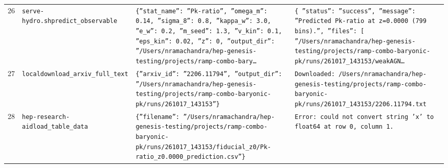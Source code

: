 \documentclass[11pt,a4paper]{article}
\begin{document}
\begin{longtable}{@{}p{}p{}p{}p{}@{}}
26 & \texttt{serve-hydro.sh}\newline\texttt{predict\_\allowbreak{}observable} & \texttt{\{''stat\_\allowbreak{}name'':\allowbreak{} ''Pk-ratio'',\allowbreak{} ''omega\_\allowbreak{}m'':\allowbreak{} 0.14,\allowbreak{} ''sigma\_\allowbreak{}8'':\allowbreak{} 0.8,\allowbreak{} ''kappa\_\allowbreak{}w'':\allowbreak{} 3.0,\allowbreak{} ''e\_\allowbreak{}w'':\allowbreak{} 0.2,\allowbreak{} ''m\_\allowbreak{}seed'':\allowbreak{} 1.3,\allowbreak{} ''v\_\allowbreak{}kin'':\allowbreak{} 0.1,\allowbreak{} ''eps\_\allowbreak{}kin'':\allowbreak{} 0.02,\allowbreak{} ''z'':\allowbreak{} 0,\allowbreak{} ''output\_\allowbreak{}dir'':\allowbreak{} ''/\allowbreak{}Users/\allowbreak{}nramachandra/\allowbreak{}hep-genesis-testing/\allowbreak{}projects/\allowbreak{}ramp-combo-bary\ldots{}\allowbreak{}} & \texttt{\{   ''status'':\allowbreak{} ''success'',\allowbreak{}   ''message'':\allowbreak{} ''Predicted Pk-ratio at z=\allowbreak{}0.0000 (799 bins)\allowbreak{}.'',\allowbreak{}   ''files'':\allowbreak{} [     ''/\allowbreak{}Users/\allowbreak{}nramachandra/\allowbreak{}hep-genesis-testing/\allowbreak{}projects/\allowbreak{}ramp-combo-baryonic-pk/\allowbreak{}runs/\allowbreak{}261017\_\allowbreak{}143153/\allowbreak{}weakAGN\ldots{}\allowbreak{}} \\
27 & \texttt{local}\newline\texttt{download\_\allowbreak{}arxiv\_\allowbreak{}full\_\allowbreak{}text} & \texttt{\{''arxiv\_\allowbreak{}id'':\allowbreak{} ''2206.11794'',\allowbreak{} ''output\_\allowbreak{}dir'':\allowbreak{} ''/\allowbreak{}Users/\allowbreak{}nramachandra/\allowbreak{}hep-genesis-testing/\allowbreak{}projects/\allowbreak{}ramp-combo-baryonic-pk/\allowbreak{}runs/\allowbreak{}261017\_\allowbreak{}143153''\}\allowbreak{}} & \texttt{Downloaded:\allowbreak{} /\allowbreak{}Users/\allowbreak{}nramachandra/\allowbreak{}hep-genesis-testing/\allowbreak{}projects/\allowbreak{}ramp-combo-baryonic-pk/\allowbreak{}runs/\allowbreak{}261017\_\allowbreak{}143153/\allowbreak{}2206.11794.txt} \\
28 & \texttt{hep-research-aid}\newline\texttt{load\_\allowbreak{}table\_\allowbreak{}data} & \texttt{\{''filename'':\allowbreak{} ''/\allowbreak{}Users/\allowbreak{}nramachandra/\allowbreak{}hep-genesis-testing/\allowbreak{}projects/\allowbreak{}ramp-combo-baryonic-pk/\allowbreak{}runs/\allowbreak{}261017\_\allowbreak{}143153/\allowbreak{}fiducial\_\allowbreak{}z0/\allowbreak{}Pk-ratio\_\allowbreak{}z0.0000\_\allowbreak{}prediction.csv''\}\allowbreak{}} & \texttt{Error:\allowbreak{} could not convert string 'x' to float64 at row 0,\allowbreak{} column 1.} \\

\end{longtable}
\end{document}
